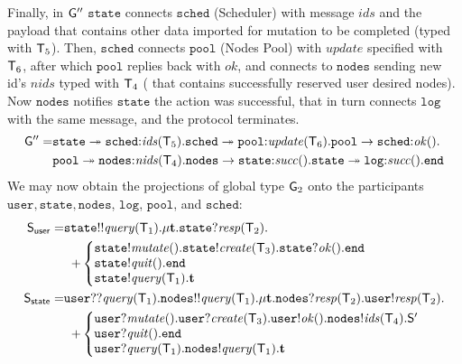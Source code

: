 Finally, in ${\sf G}''$ $\mathtt{state}$ connects $\mathtt{sched}$ (Scheduler) with message $\mathit{ids}$ and the payload that contains other data imported for mutation to be completed (typed with ${\mathsf T}_5$). 
Then, $\mathtt{sched}$ connects $\mathtt{pool}$ (Nodes Pool) with $\mathit{update}$ specified with ${\mathsf T}_6$, after which $\mathtt{pool}$ replies back with $\mathit{ok}$, and connects to $\mathtt{nodes}$ sending new id's $\mathit{nids}$ typed with ${\mathsf T}_4$ ( that contains successfully reserved user desired nodes). Now $\mathtt{nodes}$ notifies $\mathtt{state}$ the action was successful, that in turn connects $\mathtt{log}$ with the same message, and the protocol terminates.
\begin{align*}
\G'' = &
\mathtt{state}\twoheadrightarrow\mathtt{sched}{:}\mathit{ids}(\T_5).
\mathtt{sched}\twoheadrightarrow\mathtt{pool}{:}\mathit{update}(\T_6).\mathtt{pool}\to\mathtt{sched}{:}\mathit{ok}(). \\
& %
\mathtt{pool}\twoheadrightarrow\mathtt{nodes}{:}\mathit{nids}(\T_4). 
\mathtt{nodes}\to\mathtt{state}{:}\mathit{succ}().
\mathtt{state}\twoheadrightarrow \mathtt{log}{:}\mathit{succ}().\tend
\end{align*}
We may now obtain the projections of global type ${\sf G}_2$ onto the participants $\mathtt{user}, \mathtt{state}, \mathtt{nodes}$, $\mathtt{log}$, $\mathtt{pool}$, and $\mathtt{sched}$:
\begin{align*}
\ST_\mathsf{user} = & 
\mathtt{state}{!!}\mathit{query}(\T_1).\mu \ty. 
\mathtt{state}{?}\mathit{resp}(\T_2).\\
& \hspace{2mm}
{+}
\left\{
\begin{array}{@{}l@{}}
\mathtt{state}{!}\mathit{mutate}().\mathtt{state}{!}\mathit{create}(\T_3).\mathtt{state}{?}\mathit{ok}().\tend\\
\mathtt{state}{!}\mathit{quit}().\tend\\
\mathtt{state}{!}\mathit{query}(\T_1).\ty
\end{array} \right.\\
%
\ST_\mathsf{state} = &
\mathtt{user}{??}\mathit{query}(\T_1).
\mathtt{nodes}{!!}\mathit{query}(\T_1). %
\mu \ty. 
\mathtt{nodes}{?}\mathit{resp}(\T_2). 
\mathtt{user}{!}\mathit{resp}(\T_2).\\
& \hspace{2mm}
{+}
\left\{
\begin{array}{@{}l@{}}
\mathtt{user}{?}\mathit{mutate}().\mathtt{user}{?}\mathit{create}(\T_3).\mathtt{user}{!}\mathit{ok}().
\mathtt{nodes}{!}\mathit{ids}(\T_4).\ST'\\
\mathtt{user}{?}\mathit{quit}().\tend \\
\mathtt{user}{?}\mathit{query}(\T_1).\mathtt{nodes}{!}\mathit{query}(\T_1).\ty
\end{array} \right.
\end{align*}

